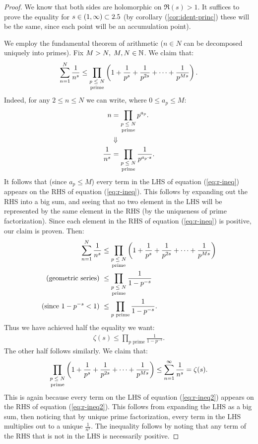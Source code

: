 \begin{proof}
We know that both sides are holomorphic on $\Re(s) >1$. It suffices to prove the equality for $s \in (1, \infty) \subset 2.5$ (by corollary (\ref{cor:ident-princ}) these will be the same, since each point will be an accumulation point).

We employ the fundamental theorem of arithmetic ($ n \in N$ can be decomposed uniquely into primes). Fix $M> N, \; M,N \in \mathbb{N}$. We claim that:
\begin{align}\label{eq:r-ineq}
    \sum_{n=1}^N \frac{1}{n^s} \leq \prod_{\text{\stackanchor{$p \leq N$}{prime}}} \br{1 + \frac{1}{p^s} + \frac{1}{p^{2s} } + \cdots + \frac{1}{p^{Ms}}}.
\end{align}
Indeed, for any $2 \leq n \leq N$ we can write, where $0 \leq a_p \leq M$:
\begin{align*}
n &= \prod_{\text{\stackanchor{$p \leq N$}{prime}}} p ^{a_p}.\\
&\Downarrow\\
\frac{1}{n^s} &= \prod_{\text{\stackanchor{$p \leq N$}{prime}}} \frac{1}{p^{a_p  \cdot s}}.
\end{align*}
It follows that (since $a_p \leq M$) every term in the LHS of equation (\ref{eq:r-ineq}) appears on the RHS of equation (\ref{eq:r-ineq}). This follows by expanding out the RHS into a big sum, and seeing that no two element in the LHS will be represented by the same element in the RHS (by the uniqueness of prime factorization). Since each element in the RHS of equation (\ref{eq:r-ineq}) is positive, our claim is proven. Then:
\begin{align*}
    \sum_{n=1}^N \frac{1}{n^s} &\leq \prod_{\text{\stackanchor{$p \leq N$}{prime}}} \br{1 + \frac{1}{p^s} + \frac{1}{p^{2s} } + \cdots + \frac{1}{p^{Ms}}}\\
    \text{(geometric series) }&\leq \prod_{\text{\stackanchor{$p \leq N$}{prime}}} \frac{1}{1-p^{-s}}\\
    \text{(since $1-p^{-s} < 1$) }&\leq \prod_{p  \text{ prime}} \frac{1}{1-p^{-s}}.
\end{align*}
Thus we have achieved half the equality we want:
\begin{align*}
    \zeta(s) \leq \prod_{p  \text{ prime}} \frac{1}{1-p^{-s}}.
\end{align*}
The other half follows similarly. We claim that:
\begin{align}\label{eq:r-ineq2}
    \prod_{\text{\stackanchor{$p \leq N$}{prime}}} \br{1 + \frac{1}{p^s} + \frac{1}{p^{2s} } + \cdots + \frac{1}{p^{Ms}}} \leq \sum_{n=1}^\infty \frac{1}{n^s} = \zeta(s).
\end{align}
This is again because every term on the LHS of equation (\ref{eq:r-ineq2}) appears on the RHS of equation (\ref{eq:r-ineq2}). This follows from expanding the LHS as a big sum, then noticing that by unique prime factorization, every term in the LHS multiplies out to a unique $\frac{1}{n^s}$. The inequality follows by noting that any term of the RHS that is not in the LHS is necessarily positive.


\end{proof}
